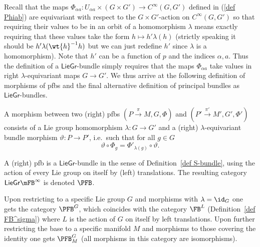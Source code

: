 Recall that the maps $\Phi_{\alpha a}:U_{\alpha a}\times (G\times G')\to C^\infty(G,G')$ defined in (\ref{def Phiab}) are equivariant with respect to the $G\times G'$-action on $C^\infty(G,G')$ so that requiring their values to be in an orbit of a homomorphism $\lambda$ means exactly requiring that these values take the form $h\mapsto h'\lambda (h)$ (strictly speaking it should be $h'\lambda(\wt{h}^{-1}h)$ but we can just redefine $h'$ since $\lambda$ is a homomorphism). Note that $h'$ can be a function of $p$ and the indices $\alpha,a$. Thus the definition of a $\mathsf{LieGr}$-bundle simply requires that the maps $\Phi_{\alpha a}$ take values in right $\lambda$-equivariant maps $G\to G'$. We thus arrive at the following definition of morphisms of \glspl{pfb} and the final alternative definition of principal bundles as $\mathsf{LieGr}$-bundles.



\begin{defn}
    A morphism between two (right) \glspl{pfb} $(P\overset{\pi}{\to}M,G,\Phi)$ and $(P'\overset{\pi'}{\to}M',G',\Phi')$ consists of a Lie group homomorphism $\lambda:G\to G'$ and a (right) $\lambda$-equivariant bundle morphism $\vartheta:P\to P'$, i.e.\ such that for all $g\in G$
    \[\vartheta\circ \Phi_{g}=\Phi'_{\lambda(g)}\circ \vartheta.\]
\end{defn}

\begin{defn}\label{def pfb 3}
    A (right) \gls{pfb} is a $\mathsf{LieGr}$-bundle in the sense of Definition~\ref{def S-bundle}, using the action of every Lie group on itself by (left) translations. The resulting category $\mathsf{LieGr}\mFB^\infty$ is denoted $\PFB$. 
    
    Upon restricting to a specific Lie group $G$ and morphisms with $\lambda=\id_G$ one gets the category $\PFB^G$, which coincides with the category $\FB^L$ (Definition~\ref{def FB^sigma}) where $L$ is the action of $G$ on itself by left translations. Upon further restricting the base to a specific manifold $M$ and morphisms to those covering the identity one gets $\PFB^G_M$ (all morphisms in this category are isomorphisms).
\end{defn}

